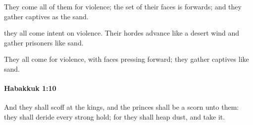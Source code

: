 			\begin{versebox}
					\item[BHS] 
					\item[LXX] 
					\item[ASV] They come all of them for violence; the set of their faces is forwards; and they gather captives as the sand.
					\item[NIV] they all come intent on violence. Their hordes advance like a desert wind and gather prisoners like sand.
					\item[NRSV] They all come for violence, with faces pressing forward; they gather captives like sand.
			\end{versebox}

		\paragraph{Habakkuk 1:10} %
			\label{HABAKKUK-1-10}

			And they shall scoff at the kings, and the princes shall be a scorn unto them: they shall deride every strong hold; for they shall heap dust, and take it.

